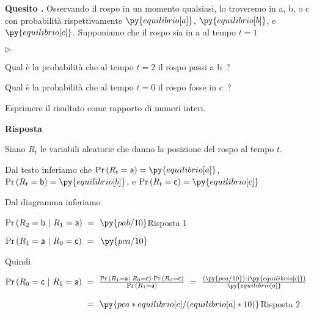 \documentclass[11pt,twoside,a4paper]{article}
\newcommand{\mylabel}[1]{#1\hfill}
\renewenvironment{itemize}
  {\begin{list}{$\triangleright$}{%
   \setlength{\parskip}{0mm}
   \setlength{\topsep}{.4\baselineskip}
   \setlength{\rightmargin}{0mm}
   \setlength{\listparindent}{0mm}
   \setlength{\itemindent}{0mm}
   \setlength{\labelwidth}{2ex}
   \setlength{\itemsep}{.4\baselineskip}
   \setlength{\parsep}{0mm}
   \setlength{\partopsep}{0mm}
   \setlength{\labelsep}{1ex}
   \setlength{\leftmargin}{\labelwidth+\labelsep}
   \let\makelabel\mylabel}}{%
   \end{list}\vspace*{-1.3mm}}
\def\Pr{{\rm Pr\,}}
\newcounter{quesito}
\newenvironment{question}{\bigskip\addtocounter{quesito}{1}\par\textbf{Quesito \thequesito.}}{\vspace{\parskip}}
\newenvironment{answer}{\par\textbf{Risposta\quad}}{\vspace{\parskip}}
\begin{document}
\begin{question}
Osservando il rospo in un momento qualsiasi, lo troveremo in {\sf a}, {\sf b}, o {\sf c} con probabilità rispettivamente $\py{equilibrio[a]}$, $\py{equilibrio[b]}$, e $\py{equilibrio[c]}$. Supponiamo che il rospo sia in {\sf a} al tempo $t=1$ 

\begin{itemize}
\item[1.] Qual è la probabilità che al tempo $t=2$ il rospo passi a {\sf b}~?

\item[2.] Qual è la probabilità che al tempo $t=0$ il rospo fosse in {\sf c}~?
\end{itemize}

Esprimere il risultato come rapporto di numeri interi.

\begin{answer}

Siano $R_t$ le variabili aleatorie che danno la posizione del rospo al tempo $t$.

Dal testo inferiamo che $\Pr(R_t={\sf a})=\py{equilibrio[a]}$, $\Pr(R_t={\sf b})=\py{equilibrio[b]}$, e $\Pr(R_t={\sf c})=\py{equilibrio[c]}$

Dal diagramma inferiamo 

$\Pr(R_{2}={\sf b}~|~R_1={\sf a})\ =\kern1.2ex${\color{blue}$\py{pab/10}$\hfill Risposta 1}

$\Pr(R_{1}={\sf a}~|~R_0={\sf c})\ =\kern1.2ex\py{pca/10}$

Quindi

$\Pr(R_0={\sf c}~|~R_1={\sf a})
\ =\ \frac{\Pr(R_1={\sf a}\,|\,R_0={\sf c})\cdot\Pr(R_0={\sf c})}{\Pr(R_1={\sf a})}
\ =\ \frac{(\py{pca/10})\cdot(\py{equilibrio[c]})}{\py{equilibrio[a]}}$

$\phantom{\Pr(R_0={\sf c}~|~R_1={\sf a})}
\ =\kern1.2ex${\color{blue}$\py{pca*equilibrio[c]/(equilibrio[a]*10)}$\hfill Risposta 2}

\end{answer}



\end{question}
\end{document}
